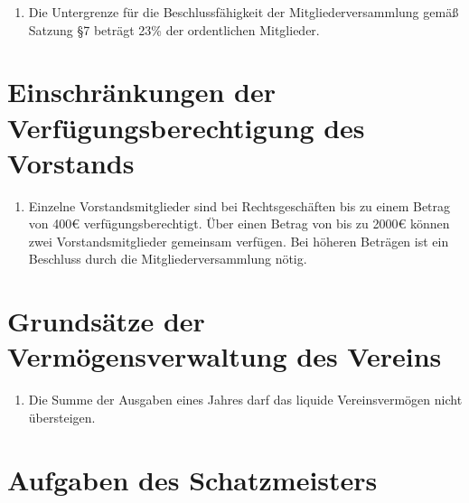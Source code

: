 \documentclass[fontsize=12pt,paper=a4,pagesize]{scrartcl}
\begin{document}
\begin{enumerate}
    \item Die Untergrenze für die Beschlussfähigkeit der
        Mitgliederversammlung gemäß Satzung §7 beträgt 23\% der ordentlichen
        Mitglieder.
\end{enumerate}

\section{Einschränkungen der Verfügungsberechtigung des Vorstands}
\begin{enumerate}
    \item Einzelne Vorstandsmitglieder sind bei Rechtsgeschäften bis zu
        einem Betrag von 400\euro{} verfügungsberechtigt. Über einen Betrag
        von bis zu 2000\euro{} können zwei Vorstandsmitglieder gemeinsam
        verfügen. Bei höheren Beträgen ist ein Beschluss durch die
        Mitgliederversammlung nötig.
\end{enumerate}

\section{Grundsätze der Vermögensverwaltung des Vereins}

\begin{enumerate}
    \item Die Summe der Ausgaben eines Jahres darf das liquide
            Vereinsvermögen nicht übersteigen.
\end{enumerate}

\section{Aufgaben des Schatzmeisters}
\end{document}
